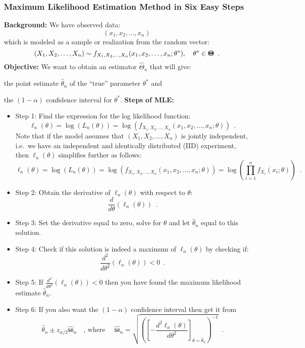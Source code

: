 \subsubsection*{Maximum Likelihood Estimation Method in Six Easy Steps}
{\bf Background:} We have observed data:
\[
(x_1,x_2,\ldots,x_n)
\]
which is modeled as a sample or realization from the random vector:
\[
(X_1,X_2,\ldots,X_n) \sim f_{X_1,X_2,\ldots,X_n}(x_1,x_2,\ldots,x_n; \theta^*), \quad \theta^* \in {\Theta}\mspace{-11 mu}{\Theta} \enspace .
\]
{\bf Objective:} We want to obtain an estimator $\widehat{\Theta}_n$ that will give:
\be
\item the point estimate $\widehat{\theta}_n$ of the ``true'' parameter $\theta^*$ and
\item the $(1-\alpha)$ confidence interval for $\theta^*$.
\ee
{\bf Steps of MLE:} 
\begin{itemize}
\item{{\sf Step 1}:} Find the expression for the log likelihood function:
\[
\ell_n(\theta) = \log(L_n(\theta)) = \log\left( f_{X_1,X_2,\ldots,X_n}(x_1,x_2,\ldots,x_n; \theta) \right) \enspace .
\]
Note that if the model assumes that $(X_1,X_2,\ldots,X_n)$ is jointly independent, i.e.~we have an independent and identically distributed (IID) experiment, then $\ell_n(\theta)$ simplifies further as follows:
\[
\ell_n(\theta) = \log(L_n(\theta)) = \log\left( f_{X_1,X_2,\ldots,X_n}(x_1,x_2,\ldots,x_n; \theta) \right) = \log \left(\prod_{i=1}^n f_{X_i}(x_i;\theta) \right) %
\enspace .
\]

\item{{\sf Step 2}:} Obtain the derivative of $\ell_n(\theta)$ with respect to $\theta$:
\[
\frac{d}{d \theta}\left(\ell_n(\theta)\right) \enspace .
\]
\item{{\sf Step 3}:} Set the derivative equal to zero, solve for $\theta$ and let $\widehat{\theta}_n$ equal to this solution. 
\item{{\sf Step 4}:} Check if this solution is indeed a maximum of $\ell_n(\theta)$ by checking  if:
\[
\frac{d^2}{d \theta^2}\left(\ell_n(\theta)\right) < 0 \enspace .
\]
\item{{\sf Step 5}:} If $\frac{d^2}{d \theta^2}\left(\ell_n(\theta)\right) < 0$ then you have found the maximum likelihood estimate $\widehat{\theta}_n$.
\item{{\sf Step 6}:} If you also want the $(1-\alpha)$ confidence interval then get it from
\[
\widehat{\theta}_n \pm z_{\alpha/2} \widehat{\mathsf{se}}_n \quad \text{, where } \quad \widehat{\mathsf{se}}_n = \sqrt{\left( \left[ -\frac{d^2 \ell_n(\theta)}{d \theta^2}\right]_{\theta=\widehat{\theta}_n}\right)^{-1}} \enspace .
\]
\end{itemize}

